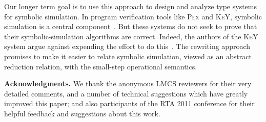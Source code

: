 \documentclass{LMCS}
\begin{document}
Our longer term goal is to use this approach to design and analyze
type systems for symbolic simulation.  In program verification tools
like \textsc{Pex} and \textsc{KeY}, symbolic simulation is a central
component~\cite{KeyBook2007,Tillmann+2005}.  But these systems do not
seek to prove that their symbolic-simulation algorithms are correct.
Indeed, the authors of the \textsc{KeY} system argue against expending
the effort to do this~\cite{Beckert+06}.  The rewriting approach
promises to make it easier to relate symbolic simulation, viewed as an
abstract reduction relation, with the small-step operational
semantics.

\textbf{Acknowledgments.} We thank the anonymous LMCS reviewers for
their very detailed comments, and a number of technical suggestions
which have greatly improved this paper; and also participants of the
RTA 2011 conference for their helpful feedback and suggestions about
this work.
\end{document}
